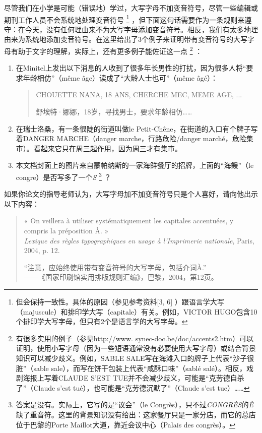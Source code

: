 尽管我们在小学是可能（错误地）学过，大写字母不加变音符号，尽管一些编辑或期刊工作人员不会系统地处理变音符号
    \footnote{但会保持一致性。具体的原因（参见参考资料[3, 6]%
    ）跟语言学大写（majuscule）和排印学大写（capitale）有关。例如，VICTOR HUGO包含10个排印学大写字母，但只有2个是语言学的大写字母。}
，但下面这句话需要作为一条规则来遵守：在今天，没有任何理由来不为大写字母添加变音符号。相反，我们有太多地理由来为系统地添加变音符号。在这里给出了3个例子来证明带有变音符号的大写字母有助于文字的理解，实际上，还有更多例子能佐证这一点
    \footnote{有很多实用的例子（参见http://www. synec-doc.be/doc/accents2.htm）可以证明，使用小写字母（因为一些短语通常没有必要使用大写字母）或结合背景知识可以减少歧义。例如，SABLE SALE写在海滩入口的牌子上代表``沙子很脏''（sable sale），而写在饼干包装上代表``咸酥口味''（sablé salé）。相反，戏剧海报上写着CLAUDE S'EST TUE并不会减少歧义，可能是``克劳德自杀了''（Claude s'est tué），也可能是``克劳德沉默了''（Claude s'est tue）……}
：

\begin{enumerate}
    \item 在Minitel上发出以下消息的人收到了很多年长男性的打扰，因为很多人将``要求年龄相仿''（même âge）读成了``大龄人士也可''（même âgé）：
    \begin{quote}
        CHOUETTE NANA, 18 ANS, CHERCHE MEC, MEME AGE, ... 
        \begin{bil}
            舒埃特·娜娜，18岁，寻找男士，要求年龄相仿……
        \end{bil}
    \end{quote}
    \item 在瑞士洛桑，有一条很陡的街道叫做le Petit-Chêne，在街道的入口有个牌子写着DANGER MARCHE（danger marche，行路危险/danger marché，危险集市）。看起来它只在周三起作用，因为周三才有集市。
    \item 本文档封面上的图片来自蒙帕纳斯的一家海鲜餐厅的招牌，上面的``海鳗''（le congre）是否写多了一个\emph{S}%
        \footnote{答案是没有。实际上，它写的是``议会''（le Congrès），只不过\emph{CONGRÈS}的\emph{È}缺了重音符。这里的背景知识没有给出：这家餐厅只是一家分店，而它的总店位于巴黎的Porte Maillot大道，靠近会议中心（Palais des congrès）。}
    ？
\end{enumerate}

如果你论文的指导老师认为，大写字母加不加变音符号只是个人喜好，请向他出示以下内容：

\begin{quote}
    « On veillera à utiliser systématiquement les capitales accentuées, y compris la préposition À. »\\
    \emph{Lexique des règles typographiques en usage à l'Imprimerie nationale}, Paris, 2004, p. 12.
    \begin{bil}
        ``注意，应始终使用带有变音符号的大写字母，包括介词À.''\\
        ——《国家印刷馆实用排版规则汇编》，巴黎，2004，第12页。
    \end{bil}
\end{quote}


